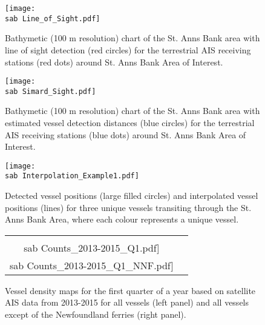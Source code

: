 \documentclass{beamer}
\numberwithin{equation}{section}		%
\numberwithin{figure}{section}		%
\numberwithin{table}{section}				%
\newcommand{\ecomod}{\string~/ecomod_data/}   %
\newcommand{\sab}{\ecomod/mpa/sab/}   %
\begin{document}

\begin{frame}

\begin{figure}[h]
	\centering
	\texttt{[image: \\sab Line\_of\_Sight.pdf]}
	\caption{Bathymetic (100 m resolution) chart of the  St. Anns Bank area with line of sight detection (red circles) for the terrestrial AIS receiving stations (red dots) around St. Anns Bank Area of Interest.}
   \label{fig:LOF}
\end{figure}

\end{frame}




\begin{frame}

\begin{figure}[h]
	\centering
	\texttt{[image: \\sab Simard\_Sight.pdf]}
	\caption{Bathymetic (100 m resolution) chart of the  St. Anns Bank area with  \textcite{Simard2014shipping} estimated vessel detection distances (blue circles) for the terrestrial AIS receiving stations (blue dots) around St. Anns Bank Area of Interest.}
  \label{fig:DetAIS}
\end{figure}

\end{frame}



\begin{frame}
  
\begin{figure}[h]
	\centering
	\texttt{[image: \\sab Interpolation\_Example1.pdf]}
	\caption{Detected vessel positions (large filled circles) and interpolated vessel positions (lines) for three unique vessels transiting through the St. Anns Bank Area, where each colour represents a unique vessel.}
	\label{fig:astar}
\end{figure}

\end{frame}

\begin{frame}
\begin{figure}[h]

	\centering
	\begin{tabular}{cc}
		\texttt{[image: \\sab Counts\_2013-2015\_Q1.pdf]} &
		\texttt{[image: \\sab Counts\_2013-2015\_Q1\_NNF.pdf]}
	\end{tabular}
	\caption{Vessel density maps for the first quarter of a year based on satellite AIS data from 2013-2015 for all vessels (left panel) and all vessels except of the Newfoundland ferries (right panel).}
	\label{fig:countmaps}
\end{figure}
\end{frame}
\end{document}
